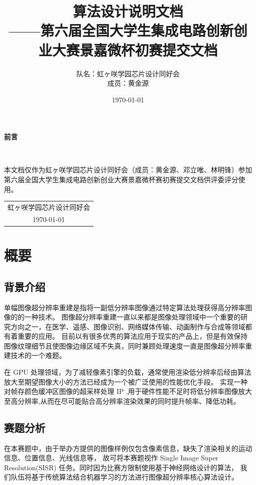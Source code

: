 \documentclass[12pt, a4paper, oneside]{ctexbook}
\title{{\Huge{\textbf{算法设计说明文档}}}\normalsize{\\——第六届全国大学生集成电路创新创业大赛景嘉微杯初赛提交文档}}
\author{队名：虹ヶ咲学园芯片设计同好会\\ 成员：黄金源\space邓立唯\space林明锋}
\date{\today}
\begin{document}
	
	
	
	\maketitle	
	\setcounter{page}{1}
	\begin{center}
		\Huge\textbf{前言}
	\end{center}~\
	
	本文档仅作为虹ヶ咲学园芯片设计同好会（成员：黄金源、邓立唯、林明锋）参加第六届全国大学生集成电路创新创业大赛景嘉微杯赛初赛提交文档供评委评分使用。
	~\\
	\begin{flushright}
		\begin{tabular}{c}
			虹ヶ咲学园芯片设计同好会\\
			\today
		\end{tabular}
	\end{flushright}
	\newpage
	\setcounter{page}{1}
	\tableofcontents
	\newpage
	\setcounter{page}{1}
	
	\chapter{概要}
	\section{背景介绍}
	单幅图像超分辨率重建是指将一副低分辨率图像通过特定算法处理获得高分辨率图像的的一种技术。
	图像超分辨率重建一直以来都是图像处理领域中一个重要的研究方向之一，在医学、遥感、图像识别、网络媒体传输、动画制作与合成等领域都有着重要的应用。
	目前以有很多优秀的算法应用于现实的产品上，但是有效保持图像纹理细节且使图像边缘区域不失真，同时兼顾处理速度一直是图像超分辨率重建技术的一个难题。
	\par 在 GPU 处理领域，为了减轻像素引擎的负载，通常使用渲染低分辨率后经由算法放大至期望图像大小的方法已经成为一个被广泛使用的性能优化手段。
	实现一种对帧存颜色缓冲区图像的超采样处理 IP ,用于硬件性能不足时将低分辨率图像放大至高分辨率,从而在尽可能贴合高分辨率渲染效果的同时提升帧率、降低功耗。
	\section{赛题分析}
	在本赛题中，由于举办方提供的图像样例仅包含像素信息，缺失了渲染相关的运动信息、位置信息、光线信息等，
	故可将本赛题视作 Single Image Super Resolution(SISR) 任务。同时因为比赛方限制使用基于神经网络设计的算法，
	我们队伍将基于传统算法结合机器学习的方法进行图像超分辨率核心算法设计。
	
\end{document}
